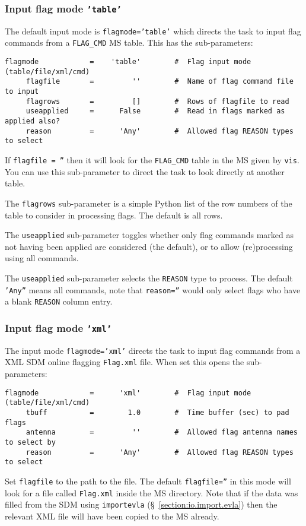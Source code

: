 \subsubsection{Input flag mode {\tt 'table'}}
\label{section:edit.flagcmd.flagmode.table}

The default input mode is {\tt flagmode='table'} which directs the
task to input flag commands from a {\tt FLAG\_CMD} MS table.  
This has the sub-parameters:
\small
\begin{verbatim}
flagmode            =    'table'        #  Flag input mode (table/file/xml/cmd)
     flagfile       =         ''        #  Name of flag command file to input
     flagrows       =         []        #  Rows of flagfile to read
     useapplied     =      False        #  Read in flags marked as applied also?
     reason         =      'Any'        #  Allowed flag REASON types to select
\end{verbatim}
\normalsize
If {\tt flagfile = ''} then it will look for the {\tt FLAG\_CMD} 
table in the MS given by {\tt vis}.  You can use this sub-parameter to
direct the task to look directly at another table.

The {\tt flagrows} sub-parameter is a simple Python list of the row
numbers of the table to consider in processing flags.  The default is
all rows.

The {\tt useapplied} sub-parameter toggles whether only flag commands
marked as not having been applied are considered (the default), or
to allow (re)processing using all commands.

The {\tt useapplied} sub-parameter selects the {\tt REASON} type to
process.  The default {\tt 'Any''} means all commands, note that
{\tt reason=''} would only select flags who have a blank {\tt REASON}
column entry.

\subsubsection{Input flag mode {\tt 'xml'}}
\label{section:edit.flagcmd.flagmode.xml}

The input mode {\tt flagmode='xml'} directs the
task to input flag commands from a XML SDM online flagging 
{\tt Flag.xml} file.  
When set this opens the sub-parameters:
\small
\begin{verbatim}
flagmode            =      'xml'        #  Flag input mode (table/file/xml/cmd)
     tbuff          =        1.0        #  Time buffer (sec) to pad flags
     antenna        =         ''        #  Allowed flag antenna names to select by
     reason         =      'Any'        #  Allowed flag REASON types to select
\end{verbatim}
\normalsize
Set {\tt flagfile} to the path to the file.  The default 
{\tt flagfile=''} in this mode will look for a file called 
{\tt Flag.xml} inside the MS directory.  Note that if the
data was filled from the SDM using {\tt importevla}
(\S~\ref{section:io.import.evla}) then the relevant XML file
will have been copied to the MS already.

